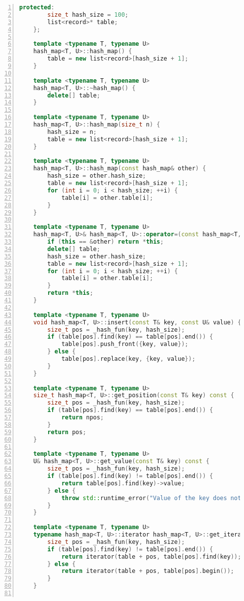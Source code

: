 \documentclass{article}
\begin{document}
\begin{lstlisting}[xleftmargin = 2em,xrightmargin = 2em, aboveskip = 0.5em, numbers = left, language = C++]
    protected:
        size_t hash_size = 100;
        list<record>* table;
    };

    template <typename T, typename U>
    hash_map<T, U>::hash_map() {
        table = new list<record>[hash_size + 1];
    }

    template <typename T, typename U>
    hash_map<T, U>::~hash_map() {
        delete[] table;
    }

    template <typename T, typename U>
    hash_map<T, U>::hash_map(size_t n) {
        hash_size = n;
        table = new list<record>[hash_size + 1];
    }

    template <typename T, typename U>
    hash_map<T, U>::hash_map(const hash_map& other) {
        hash_size = other.hash_size;
        table = new list<record>[hash_size + 1];
        for (int i = 0; i < hash_size; ++i) {
            table[i] = other.table[i];
        }
    }

    template <typename T, typename U>
    hash_map<T, U>& hash_map<T, U>::operator=(const hash_map<T, U>& other) {
        if (this == &other) return *this;
        delete[] table;
        hash_size = other.hash_size;
        table = new list<record>[hash_size + 1];
        for (int i = 0; i < hash_size; ++i) {
            table[i] = other.table[i];
        }
        return *this;
    }

    template <typename T, typename U>
    void hash_map<T, U>::insert(const T& key, const U& value) {
        size_t pos = _hash_fun(key, hash_size);
        if (table[pos].find(key) == table[pos].end()) {
            table[pos].push_front({key, value});
        } else {
            table[pos].replace(key, {key, value});
        }
    }

    template <typename T, typename U>
    size_t hash_map<T, U>::get_position(const T& key) const {
        size_t pos = _hash_fun(key, hash_size);
        if (table[pos].find(key) == table[pos].end()) {
            return npos;
        }
        return pos;
    }

    template <typename T, typename U>
    U& hash_map<T, U>::get_value(const T& key) const {
        size_t pos = _hash_fun(key, hash_size);
        if (table[pos].find(key) != table[pos].end()) {
            return table[pos].find(key)->value;
        } else {
            throw std::runtime_error("Value of the key does not exist");
        }
    }

    template <typename T, typename U>
    typename hash_map<T, U>::iterator hash_map<T, U>::get_iterator(const T& key) const {
        size_t pos = _hash_fun(key, hash_size);
        if (table[pos].find(key) != table[pos].end()) {
            return iterator(table + pos, table[pos].find(key));
        } else {
            return iterator(table + pos, table[pos].begin());
        }
    }


\end{lstlisting}
\end{document}
